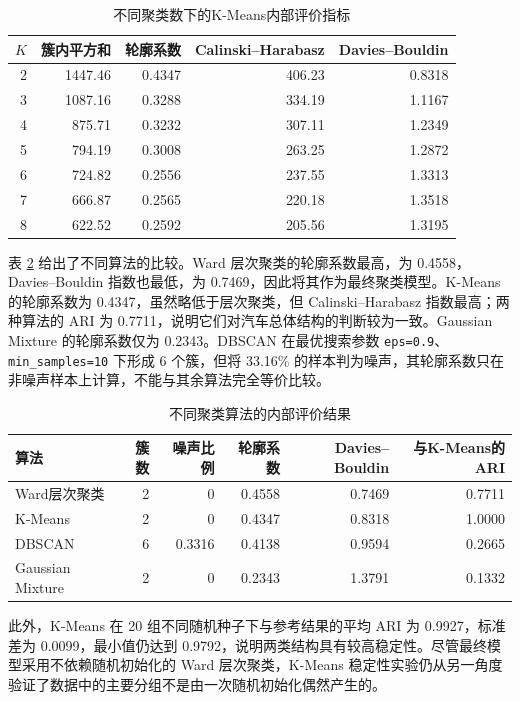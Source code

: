 \documentclass[UTF8,a4paper,12pt]{ctexart}
\begin{document}
\begin{table}[H]
\centering
\caption{不同聚类数下的K-Means内部评价指标}
\label{tab:kselect}
\small
\begin{tabular}{rrrrr}
\toprule
$K$ & 簇内平方和 & 轮廓系数 & Calinski--Harabasz & Davies--Bouldin\\
\midrule
2 & 1447.46 & 0.4347 & 406.23 & 0.8318\\
3 & 1087.16 & 0.3288 & 334.19 & 1.1167\\
4 & 875.71 & 0.3232 & 307.11 & 1.2349\\
5 & 794.19 & 0.3008 & 263.25 & 1.2872\\
6 & 724.82 & 0.2556 & 237.55 & 1.3313\\
7 & 666.87 & 0.2565 & 220.18 & 1.3518\\
8 & 622.52 & 0.2592 & 205.56 & 1.3195\\
\bottomrule
\end{tabular}
\end{table}

表 \ref{tab:modelcompare} 给出了不同算法的比较。Ward 层次聚类的轮廓系数最高，为 0.4558，Davies--Bouldin 指数也最低，为 0.7469，因此将其作为最终聚类模型。K-Means 的轮廓系数为 0.4347，虽然略低于层次聚类，但 Calinski--Harabasz 指数最高；两种算法的 ARI 为 0.7711，说明它们对汽车总体结构的判断较为一致。Gaussian Mixture 的轮廓系数仅为 0.2343。DBSCAN 在最优搜索参数 \texttt{eps=0.9}、\texttt{min\_samples=10} 下形成 6 个簇，但将 33.16\% 的样本判为噪声，其轮廓系数只在非噪声样本上计算，不能与其余算法完全等价比较。

\begin{table}[H]
\centering
\caption{不同聚类算法的内部评价结果}
\label{tab:modelcompare}
\small
\begin{tabular}{lrrrrr}
\toprule
算法 & 簇数 & 噪声比例 & 轮廓系数 & Davies--Bouldin & 与K-Means的ARI\\
\midrule
Ward层次聚类 & 2 & 0 & 0.4558 & 0.7469 & 0.7711\\
K-Means & 2 & 0 & 0.4347 & 0.8318 & 1.0000\\
DBSCAN & 6 & 0.3316 & 0.4138 & 0.9594 & 0.2665\\
Gaussian Mixture & 2 & 0 & 0.2343 & 1.3791 & 0.1332\\
\bottomrule
\end{tabular}
\end{table}

此外，K-Means 在 20 组不同随机种子下与参考结果的平均 ARI 为 0.9927，标准差为 0.0099，最小值仍达到 0.9792，说明两类结构具有较高稳定性。尽管最终模型采用不依赖随机初始化的 Ward 层次聚类，K-Means 稳定性实验仍从另一角度验证了数据中的主要分组不是由一次随机初始化偶然产生的。
\end{document}
